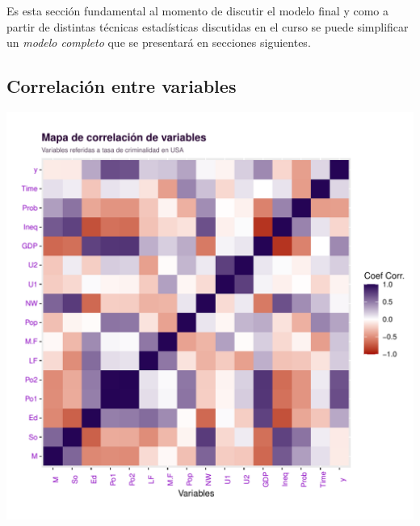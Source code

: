 \documentclass[11pt,a4paper]{article}\usepackage[]{graphicx}\usepackage[]{color}
\makeatletter
\def\maxwidth{ %
  \ifdim\Gin@nat@width>\linewidth
    \linewidth
  \else
    \Gin@nat@width
  \fi
}
\newenvironment{knitrout}{}{} %
\makeatother
\begin{document}
Es esta sección fundamental al momento de discutir el modelo final y como a partir de distintas técnicas estadísticas discutidas en el curso se puede simplificar un \textit{modelo completo} que se presentará en secciones siguientes.

\subsection{Correlación entre variables}

\begin{knitrout}
\color{fgcolor}
\includegraphics[width=\maxwidth]{figure/unnamed-chunk-2-1} 

\end{knitrout}
\end{document}
